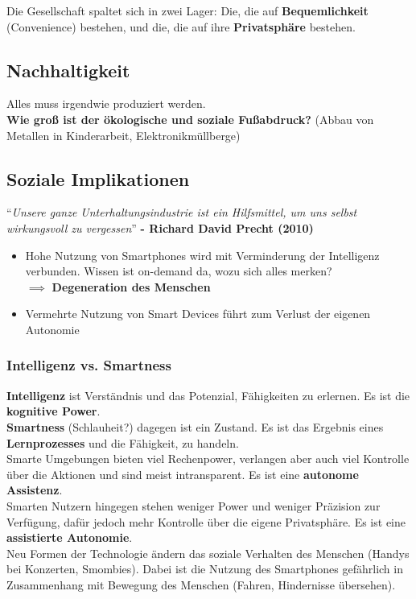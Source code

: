 \documentclass[a4paper]{article}
\begin{document}
Die Gesellschaft spaltet sich in zwei Lager: Die, die auf \textbf{Bequemlichkeit} (Convenience) bestehen, und die, die auf ihre \textbf{Privatsphäre} bestehen.

\subsection{Nachhaltigkeit}
Alles muss irgendwie produziert werden.\\
 \textbf{Wie groß ist der ökologische und soziale Fußabdruck?} (Abbau von Metallen in Kinderarbeit, Elektronikmüllberge) 
 
 \subsection{Soziale Implikationen}
 ``\textit{Unsere ganze Unterhaltungsindustrie ist ein Hilfsmittel, um uns selbst wirkungsvoll zu vergessen}'' \textbf{- Richard David Precht (2010)}\\
 
 \begin{itemize}
 	\item Hohe Nutzung von Smartphones wird mit Verminderung der Intelligenz verbunden. Wissen ist on-demand da, wozu sich alles merken?\\
 	$\implies$ \textbf{Degeneration des Menschen}
 	\item Vermehrte Nutzung von Smart Devices führt zum Verlust der eigenen Autonomie
 \end{itemize}
\subsubsection{Intelligenz vs. Smartness}
\textbf{Intelligenz} ist Verständnis und das Potenzial, Fähigkeiten zu erlernen. Es ist die \textbf{kognitive Power}.\\
\textbf{Smartness} (Schlauheit?) dagegen ist ein Zustand. Es ist das Ergebnis eines \textbf{Lernprozesses} und die Fähigkeit, zu handeln.\\

Smarte Umgebungen bieten viel Rechenpower, verlangen aber auch viel Kontrolle über die Aktionen und sind meist intransparent. Es ist eine \textbf{autonome Assistenz}.\\
Smarten Nutzern hingegen stehen weniger Power und weniger Präzision zur Verfügung, dafür jedoch mehr Kontrolle über die eigene Privatsphäre. Es ist eine \textbf{assistierte Autonomie}.\\

Neu Formen der Technologie ändern das soziale Verhalten des Menschen (Handys bei Konzerten, Smombies). Dabei ist die Nutzung des Smartphones gefährlich in Zusammenhang mit Bewegung des Menschen (Fahren, Hindernisse übersehen).
\end{document}

